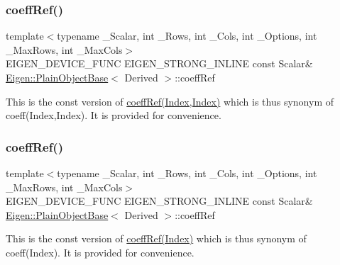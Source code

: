 \subsubsection{\texorpdfstring{coeffRef()}{coeffRef()}\hspace{0.1cm}{\footnotesize\ttfamily [3/4]}}
{\footnotesize\ttfamily template$<$typename \+\_\+\+Scalar, int \+\_\+\+Rows, int \+\_\+\+Cols, int \+\_\+\+Options, int \+\_\+\+Max\+Rows, int \+\_\+\+Max\+Cols$>$ \\
E\+I\+G\+E\+N\+\_\+\+D\+E\+V\+I\+C\+E\+\_\+\+F\+U\+NC E\+I\+G\+E\+N\+\_\+\+S\+T\+R\+O\+N\+G\+\_\+\+I\+N\+L\+I\+NE const Scalar\& \mbox{\hyperlink{class_eigen_1_1_plain_object_base}{Eigen\+::\+Plain\+Object\+Base}}$<$ Derived $>$\+::coeff\+Ref\hspace{0.3cm}{\ttfamily [inline]}}

This is the const version of \mbox{\hyperlink{class_eigen_1_1_plain_object_base_a25626a55b26a4323565f79d1b7c48ea8}{coeff\+Ref(\+Index,\+Index)}} which is thus synonym of coeff(\+Index,\+Index). It is provided for convenience. \mbox{\label{class_eigen_1_1_matrix_a982b56223d011e2f836a3408983883d4}} 
\subsubsection{\texorpdfstring{coeffRef()}{coeffRef()}\hspace{0.1cm}{\footnotesize\ttfamily [4/4]}}
{\footnotesize\ttfamily template$<$typename \+\_\+\+Scalar, int \+\_\+\+Rows, int \+\_\+\+Cols, int \+\_\+\+Options, int \+\_\+\+Max\+Rows, int \+\_\+\+Max\+Cols$>$ \\
E\+I\+G\+E\+N\+\_\+\+D\+E\+V\+I\+C\+E\+\_\+\+F\+U\+NC E\+I\+G\+E\+N\+\_\+\+S\+T\+R\+O\+N\+G\+\_\+\+I\+N\+L\+I\+NE const Scalar\& \mbox{\hyperlink{class_eigen_1_1_plain_object_base}{Eigen\+::\+Plain\+Object\+Base}}$<$ Derived $>$\+::coeff\+Ref\hspace{0.3cm}{\ttfamily [inline]}}

This is the const version of \mbox{\hyperlink{class_eigen_1_1_plain_object_base_a571632ed666076d7403c8bd3eece44f0}{coeff\+Ref(\+Index)}} which is thus synonym of coeff(\+Index). It is provided for convenience. \mbox{\label{class_eigen_1_1_matrix_a5893df80f2b3a446ce701616f8713229}} 
